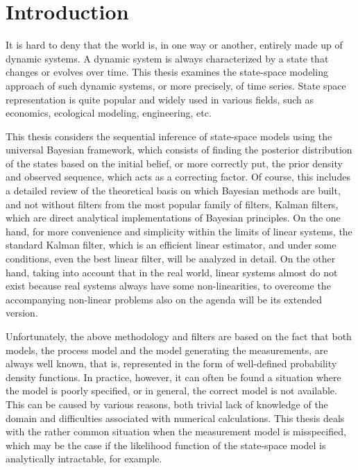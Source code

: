 \chapter*{Introduction}
\setcounter{page}{1}

It is hard to deny that the world is, in one way or another, entirely made up of dynamic systems. A dynamic system is always characterized by a state that changes or evolves over time. This thesis examines the state-space modeling approach of such dynamic systems, or more precisely,  of time series. State space representation is quite popular and widely used in various fields, such as economics, ecological modeling, engineering, etc.

This thesis considers the sequential inference of state-space models using the universal Bayesian framework, which consists of finding the posterior distribution of the states based on the initial belief, or more correctly put, the prior density and observed sequence, which acts as a correcting factor. Of course, this includes a detailed review of the theoretical basis on which Bayesian methods are built, and not without filters from the most popular family of filters, Kalman filters, which are direct analytical implementations of Bayesian principles. On the one hand, for more convenience and simplicity within the limits of linear systems, the standard Kalman filter, which is an efficient linear estimator, and under some conditions, even the best linear filter, will be analyzed in detail. On the other hand, taking into account that in the real world, linear systems almost do not exist because real systems always have some non-linearities, to overcome the accompanying non-linear problems also on the agenda will be its extended version.

Unfortunately, the above methodology and filters are based on the fact that both models, the process model and the model generating the measurements, are always well known, that is, represented in the form of well-defined probability density functions. In practice, however, it can often be found a situation where the model is poorly specified, or in general, the correct model is not available. This can be caused by various reasons, both trivial lack of knowledge of the domain and difficulties associated with numerical calculations. This thesis deals with the rather common situation when the measurement model is misspecified, which may be the case if the likelihood function of the state-space model is analytically intractable, for example.

